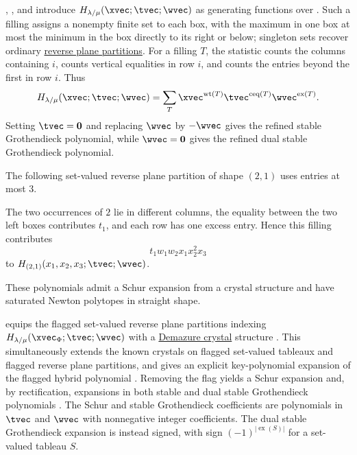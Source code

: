 , , and  introduce
$H_{\lambda/\mu}(\xvec;\tvec;\wvec)$ as generating functions over
\cite{GuoKangLiu2025x}.  Such a filling assigns a nonempty finite set to
each box, with the maximum in one box at most the minimum in the box directly
to its right or below; singleton sets recover ordinary
\hyperref[planePartitions]{reverse plane partitions}.  For a filling $T$, the statistic
 counts the columns containing $i$,
 counts vertical equalities in row $i$, and
 counts the entries beyond the first in row $i$.
Thus
\[
H_{\lambda/\mu}(\xvec;\tvec;\wvec)
=\sum_T
 \xvec^{\operatorname{wt}(T)}
 \tvec^{\operatorname{ceq}(T)}
 \wvec^{\operatorname{ex}(T)}.
\]
Setting $\tvec=\mathbf{0}$ and replacing $\wvec$ by $-\wvec$ gives the
refined stable Grothendieck polynomial, while $\wvec=\mathbf{0}$ gives the
refined dual stable Grothendieck polynomial.

\begin{example*}
The following set-valued reverse plane partition of shape $(2,1)$ uses entries
at most $3$.
\begin{figure}
\end{figure}
The two occurrences of $2$ lie in different columns, the equality between the
two left boxes contributes $t_1$, and each row has one excess entry.  Hence
this filling contributes
\[
 t_1w_1w_2x_1x_2^2x_3
\]
to $H_{(2,1)}(x_1,x_2,x_3;\tvec;\wvec)$.
\end{example*}

These polynomials admit a Schur expansion from a crystal structure and have
saturated Newton polytopes in straight shape.

 equips the flagged set-valued reverse plane
partitions indexing $H_{\lambda/\mu}(\xvec_\Phi;\tvec;\wvec)$ with a
\hyperref[demazureCrystal]{Demazure crystal} structure
\cite[Thm.~4]{Kundu2026x}.  This simultaneously extends the known crystals
on flagged set-valued tableaux and flagged reverse plane partitions, and
gives an explicit key-polynomial expansion of the flagged hybrid polynomial
\cite[Cor.~2]{Kundu2026x}.  Removing the flag yields a Schur expansion and,
by rectification, expansions in both stable and dual stable Grothendieck
polynomials \cite[Cor.~3 and Sec.~4]{Kundu2026x}.  The Schur and stable
Grothendieck coefficients are polynomials in $\tvec$ and $\wvec$ with
nonnegative integer coefficients.  The dual stable Grothendieck expansion is
instead signed, with sign $(-1)^{|\operatorname{ex}(S)|}$ for a set-valued
tableau $S$.


